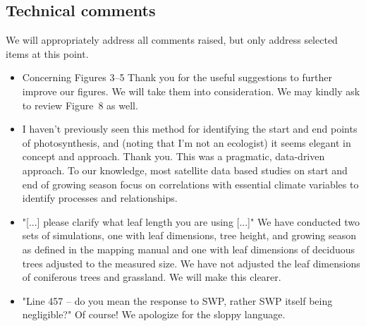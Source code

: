 \documentclass{scrartcl}
\begin{document}
\subsection*{Technical comments}
We will appropriately address all comments raised, but only address selected items at this point.
\begin{itemize}
    \item {\color{blue} Concerning Figures 3--5} Thank you for the useful suggestions to further improve our figures. We will take them into consideration. We may kindly ask to review Figure~8 as well.
    \item {\color{blue} I haven't previously seen this method for identifying the start and end points of photosynthesis, and (noting that I'm not an ecologist) it seems elegant in concept and approach.} Thank you. This was a pragmatic, data-driven approach. To our knowledge, most satellite data based studies on start and end of growing season focus on correlations with essential climate variables to identify processes and relationships.
    \item {\color{blue} "[...] please clarify what leaf length you are using [...]"} We have conducted two sets of simulations, one with leaf dimensions, tree height, and growing season as defined in the mapping manual and one with leaf dimensions of deciduous trees adjusted to the measured size. We have not adjusted the leaf dimensions of coniferous trees and grassland. We will make this clearer.
    \item {\color{blue} "Line 457 -- do you mean the response to SWP, rather SWP itself being negligible?"} Of course! We apologize for the sloppy language.

\end{itemize}
\end{document}
